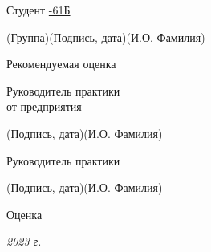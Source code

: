 \documentclass[14pt, russian]{scrartcl}
\begin{document}
\begin{titlepage}
\vspace{\fill}
 

\noindent Студент \underline{-61Б\hspace{1.5cm}} \hfill \underline{\hspace{4cm}}\quad
\underline{\hspace{4cm}}

\vspace{-2.1ex}
\noindent\hspace{9ex}\scriptsize{(Группа)}\normalsize\hspace{170pt}\hspace{2ex}\scriptsize{(Подпись, дата)}\normalsize\hspace{30pt}\hspace{6ex}\scriptsize{(И.О. Фамилия)}\normalsize

\bigskip

\noindent Рекомендуемая оценка\hfill\underline{\hspace{195pt}}\hfill

\bigskip

\noindent \parbox{0.333\textwidth}{Руководитель практики\\от предприятия}  
\hfill \underline{\hspace{4cm}}\quad \underline{\hspace{4cm}}

\vspace{-2ex}
\noindent\hspace{13.5ex}\normalsize\hspace{170pt}\hspace{2ex}\scriptsize{(Подпись, дата)}\normalsize\hspace{30pt}\hspace{6ex}\scriptsize{(И.О. Фамилия)}\normalsize


\bigskip

\noindent Руководитель практики  \hfill \underline{\hspace{4cm}}\quad
\underline{\hspace{4cm}}

\vspace{-2ex}
\noindent\hspace{13.5ex}\normalsize\hspace{170pt}\hspace{2ex}\scriptsize{(Подпись, дата)}\normalsize\hspace{30pt}\hspace{6ex}\scriptsize{(И.О. Фамилия)}\normalsize

\vspace{2ex}
\noindent Оценка\hfill\underline{\hspace{195pt}}

\vfill

 


\begin{center}
\textsl{2023 г.}
\end{center}
\end{titlepage}
\end{document}
